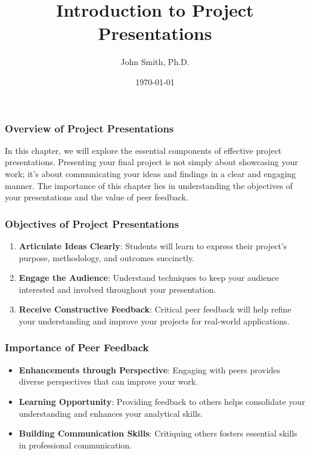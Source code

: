 \documentclass[aspectratio=169]{beamer}
\begin{document}
\frame{\titlepage}

\begin{frame}[fragile]
    \title{Introduction to Project Presentations}
    \author{John Smith, Ph.D.}
    \date{\today}
    \maketitle
\end{frame}

\begin{frame}[fragile]
    \frametitle{Overview of Project Presentations}
    In this chapter, we will explore the essential components of effective project presentations. Presenting your final project is not simply about showcasing your work; it’s about communicating your ideas and findings in a clear and engaging manner. The importance of this chapter lies in understanding the objectives of your presentations and the value of peer feedback.
\end{frame}

\begin{frame}[fragile]
    \frametitle{Objectives of Project Presentations}
    \begin{enumerate}
        \item \textbf{Articulate Ideas Clearly}: Students will learn to express their project’s purpose, methodology, and outcomes succinctly.
        \item \textbf{Engage the Audience}: Understand techniques to keep your audience interested and involved throughout your presentation.
        \item \textbf{Receive Constructive Feedback}: Critical peer feedback will help refine your understanding and improve your projects for real-world applications.
    \end{enumerate}
\end{frame}

\begin{frame}[fragile]
    \frametitle{Importance of Peer Feedback}
    \begin{itemize}
        \item \textbf{Enhancements through Perspective}: Engaging with peers provides diverse perspectives that can improve your work.
        \item \textbf{Learning Opportunity}: Providing feedback to others helps consolidate your understanding and enhances your analytical skills.
        \item \textbf{Building Communication Skills}: Critiquing others fosters essential skills in professional communication.
    \end{itemize}
\end{frame}
\end{document}
